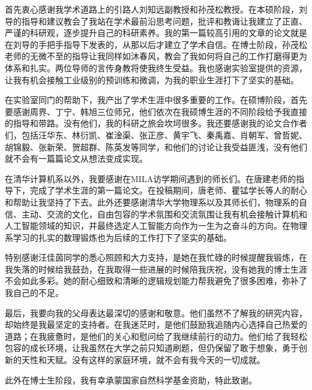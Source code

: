 
\begin{acknowledgements}
  首先衷心感谢我学术道路上的引路人刘知远副教授和孙茂松教授。在本硕阶段，刘导的指导和建议教会了我站在学术最前沿思考问题，批评和教诲让我建立了正直、严谨的科研观，逐步提升自己的科研素养。我的第一篇较高引用的文章的论文就是在刘导的手把手指导下发表的，从那以后才建立了学术自信。在博士阶段，孙茂松老师的无微不至的指导让我同样如沐春风，教会了我如何将自己的工作打磨得更为体系和扎实。两位导师的言传身教将使我终生受益。我也感谢实验室提供的资源，让我有机会接触工业级别的预训练和微调，为我的职业生涯打下了坚实的基础。
  
  在实验室同门的帮助下，我产出了学术生涯中很多重要的工作。在硕博阶段，首先要感谢周界、丁宁、韩旭三位师兄，他们依次在我硕博生涯的不同阶段给予我直接的指导和带路。没有他们，我的科研之旅会坎坷很多。我还要感谢我的论文合作者们，包括汪华东、林衍凯、崔淦渠、张正彦、黄宇飞、秦禹嘉、肖朝军、曾哲妮、胡锦毅、张新荣、贺超群、陈英发等同学，和他们的讨论让我受益匪浅，没有他们就不会有一篇篇论文从想法变成实现。

  在清华计算机系以外，我要感谢在MILA访学期间遇到的师长们。在唐建老师的指导下，完成了学术生涯的第一篇论文。在投稿期间，唐老师、瞿锰学长等人的耐心和帮助让我坚持了下去。此外还要感谢清华大学物理系以及其师长们，物理系的自信、主动、交流的文化，自由包容的学术氛围和交流氛围让我有机会接触计算机和人工智能领域的知识，并最终选定人工智能方向作为一生为之奋斗的方向。在物理系学习的扎实的数理锻炼也为后续的工作打下了坚实的基础。
  
  特别感谢汪佳茵同学的悉心照顾和大力支持，是她在我忙碌的时候提醒我锻炼，在我失落的时候给我鼓劲，在我取得一些进展的时候陪我庆祝，没有她我的博士生涯不会如此多彩。她的耐心细致和清晰的逻辑规划能力帮我避免了很多困难，弥补了我自己的不足。

  最后，我要向我的父母表达最深切的感谢和敬意。他们虽然不了解我的研究内容，却始终是我最坚定的支持者。在我迷茫时，是他们鼓励我追随内心选择自己热爱的道路；在我疲惫时，是他们的关心和慰问给了我继续前行的动力。他们给了我轻松包容的成长环境，让我虽然在大学之前只知道刷题，但仍保留了敢于想象，勇于创新的天性和天赋。没有这样的家庭环境，就不会有我今天的一切成就。

  此外在博士生阶段，我有幸承蒙国家自然科学基金资助，特此致谢。
\end{acknowledgements}
